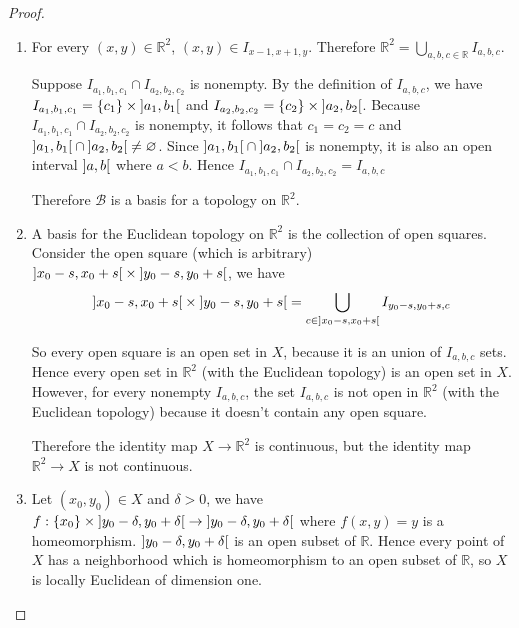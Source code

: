 \begin{proof}
	\begin{enumerate}[label={(\alph*)}]
		\item  For every $(x, y)\in \mathbb{R}^{2}$, $(x, y)\in I_{x-1,x+1,y}$. Therefore $\mathbb{R}^{2} = \bigcup_{a,b,c\in\mathbb{R}}I_{a,b,c}$.

		      Suppose $I_{a_{1},b_{1},c_{1}}\cap I_{a_{2},b_{2},c_{2}}$ is nonempty. By the definition of $I_{a,b,c}$, we have $I_{a_{1},b_{1},c_{1}} = \{c_{1}\} \times \left]{a_{1},b_{1}}\right[$ and $I_{a_{2},b_{2},c_{2}} = \{c_{2}\} \times \left]{a_{2},b_{2}}\right[$. Because $I_{a_{1},b_{1},c_{1}}\cap I_{a_{2},b_{2},c_{2}}$ is nonempty, it follows that $c_{1} = c_{2} = c$ and $\left]{a_{1},b_{1}}\right[ \cap \left]{a_{2},b_{2}}\right[\ne \varnothing$. Since $\left]{a_{1},b_{1}}\right[ \cap \left]{a_{2},b_{2}}\right[$ is nonempty, it is also an open interval $\left]{a, b}\right[$ where $a < b$. Hence $I_{a_{1},b_{1},c_{1}}\cap I_{a_{2},b_{2},c_{2}} = I_{a,b,c}$

		      Therefore $\mathscr{B}$ is a basis for a topology on $\mathbb{R}^{2}$.
		\item A basis for the Euclidean topology on $\mathbb{R}^{2}$ is the collection of open squares. Consider the open square (which is arbitrary) $\left]{x_{0} - s, x_{0} + s}\right[\times \left]{y_{0} - s, y_{0} + s}\right[$, we have
		      \[
			      \left]{x_{0} - s, x_{0} + s}\right[\times \left]{y_{0} - s, y_{0} + s}\right[ = \bigcup_{c\in \left]{x_{0} - s, x_{0} + s}\right[} I_{y_{0}-s, y_{0}+s, c}
		      \]

		      So every open square is an open set in $X$, because it is an union of $I_{a,b,c}$ sets. Hence every open set in $\mathbb{R}^{2}$ (with the Euclidean topology) is an open set in $X$. However, for every nonempty $I_{a,b,c}$, the set $I_{a,b,c}$ is not open in $\mathbb{R}^{2}$ (with the Euclidean topology) because it doesn't contain any open square.

		      Therefore the identity map $X\to \mathbb{R}^{2}$ is continuous, but the identity map $\mathbb{R}^{2}\to X$ is not continuous.
		\item Let $(x_{0}, y_{0})\in X$ and $\delta > 0$, we have $f: \{ x_{0} \}\times \left]{y_{0}-\delta, y_{0}+\delta}\right[ \to  \left]{y_{0}-\delta, y_{0}+\delta}\right[$ where $f(x, y) = y$ is a homeomorphism. $\left]{y_{0}-\delta, y_{0}+\delta}\right[$ is an open subset of $\mathbb{R}$. Hence every point of $X$ has a neighborhood which is homeomorphism to an open subset of $\mathbb{R}$, so $X$ is locally Euclidean of dimension one.


\end{enumerate}
\end{proof}
